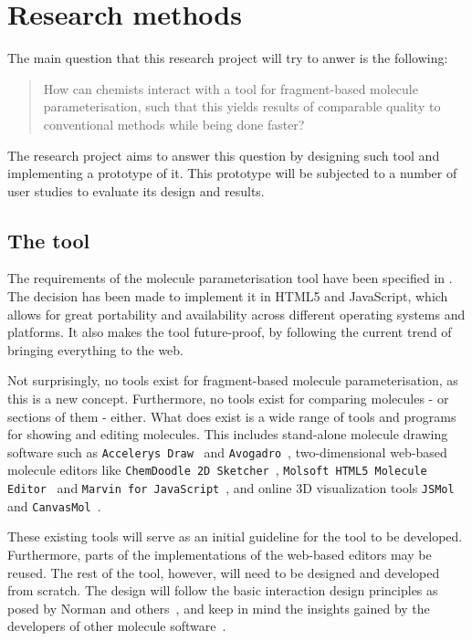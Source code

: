 \chapter{Research methods}

The main question that this research project will try to anwer is the following:
\begin{quote}
How can chemists interact with a tool for fragment-based molecule parameterisation, such that this yields results of comparable quality to conventional methods while being done faster?
\end{quote}
The research project aims to answer this question by designing such tool and implementing a prototype of it. This prototype will be subjected to a number of user studies to evaluate its design and results.


\section{The tool}

The requirements of the molecule parameterisation tool have been specified in . The decision has been made to implement it in HTML5 and JavaScript, which allows for great portability and availability across different operating systems and platforms. It also makes the tool future-proof, by following the current trend of bringing everything to the web.

Not surprisingly, no tools exist for fragment-based molecule parameterisation, as this is a new concept. Furthermore, no tools exist for comparing molecules - or sections of them - either. What does exist is a wide range of tools and programs for showing and editing molecules. This includes stand-alone molecule drawing software such as \verb|Accelerys Draw|~\cite{x} and \verb|Avogadro|~\cite{x}, two-dimensional web-based molecule editors like \verb|ChemDoodle 2D Sketcher|~\cite{x}, \verb|Molsoft HTML5 Molecule Editor|~\cite{x} and \verb|Marvin for JavaScript|~\cite{x}, and online 3D visualization tools \verb|JSMol|~\cite{x} and \verb|CanvasMol|~\cite{x}.

These existing tools will serve as an initial guideline for the tool to be developed. Furthermore, parts of the implementations of the web-based editors may be reused. The rest of the tool, however, will need to be designed and developed from scratch. The design will follow the basic interaction design principles as posed by Norman and others~\cite{x, y, z}, and keep in mind the insights gained by the developers of other molecule software~\cite{x, y, z}.


